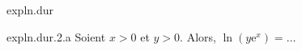 \begin{qcm}{expln.dur}
    \begin{question}{expln.dur.2.a}
         Soient \(x>0\) et \(y>0\). Alors, \(\ln\left(y\mathrm{e}^x\right)=\ldots\)
         \vspace{-1.5ex}
         \begin{multicols}{3}
         \begin{reponses}
         \end{reponses}
         \end{multicols}
    \end{question}
\end{qcm}
